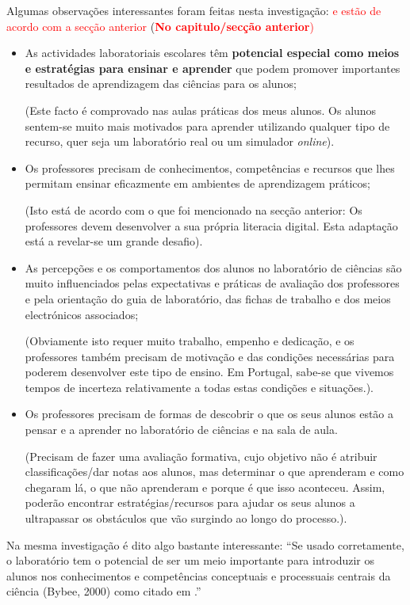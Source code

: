 Algumas observações interessantes foram feitas nesta investigação\cite{Hofstein}: \textcolor{red}{e estão de acordo com a secção anterior} (\textcolor{red}{\textbf{No capitulo/secção anterior})}
\begin{itemize}
    \item As actividades laboratoriais escolares têm \textbf{potencial especial como meios e estratégias para ensinar e aprender} que podem promover importantes resultados de aprendizagem das ciências para os alunos;

          (Este facto é comprovado nas aulas práticas dos meus alunos. Os alunos sentem-se muito mais motivados para aprender utilizando qualquer tipo de recurso, quer seja um laboratório real ou um simulador \textit{online}).
    \item Os professores precisam de conhecimentos, competências e recursos que lhes permitam ensinar eficazmente em ambientes de aprendizagem práticos;

          (Isto está de acordo com o que foi mencionado na secção anterior: Os professores devem desenvolver a sua própria literacia digital. Esta adaptação está a revelar-se um grande desafio).
    \item As percepções e os comportamentos dos alunos no laboratório de ciências são muito influenciados pelas expectativas e práticas de avaliação dos professores e pela orientação do guia de laboratório, das fichas de trabalho e dos meios electrónicos associados;

          (Obviamente isto requer muito trabalho, empenho e dedicação, e os professores também precisam de motivação e das condições necessárias para poderem desenvolver este tipo de ensino. Em Portugal, sabe-se que vivemos tempos de incerteza relativamente a todas estas condições e situações.).

    \item Os professores precisam de formas de descobrir o que os seus alunos estão a pensar e a aprender no laboratório de ciências e na sala de aula.

          (Precisam de fazer uma avaliação formativa, cujo objetivo não é atribuir classificações/dar notas aos alunos, mas determinar o que aprenderam e como chegaram lá, o que não aprenderam e porque é que isso aconteceu. Assim, poderão encontrar estratégias/recursos para ajudar os seus alunos a ultrapassar os obstáculos que vão surgindo ao longo do processo.).
\end{itemize}

Na mesma investigação é dito algo bastante interessante: ``Se usado corretamente, o laboratório tem o potencial de ser um meio importante para introduzir os alunos nos conhecimentos e competências conceptuais e processuais centrais da ciência (Bybee, 2000) como citado em \cite{Hofstein}.''

